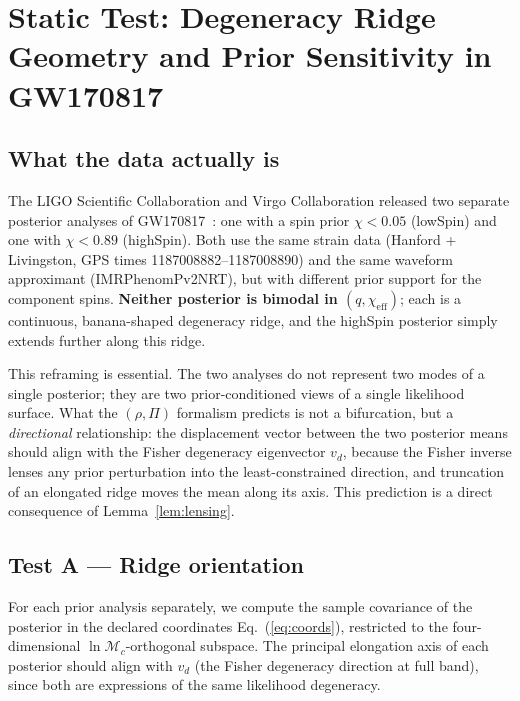 \documentclass[twocolumn,prd,showpacs,superscriptaddress]{revtex4-2}
\newcommand{\Mchirp}{\mathcal{M}_c}
\newcommand{\vd}{v_{d}}          %
\newcommand{\eqnref}[1]{Eq.~(\ref{eq:#1})}
\begin{document}
\section{Static Test: Degeneracy Ridge Geometry and Prior Sensitivity in GW170817}
\label{sec:static}

\subsection{What the data actually is}

The LIGO Scientific Collaboration and Virgo Collaboration released two separate posterior analyses of GW170817~\cite{abbott2017gw170817,abbott2019gw170817_params}: one with a spin prior $\chi < 0.05$ (lowSpin) and one with $\chi < 0.89$ (highSpin). Both use the same strain data (Hanford + Livingston, GPS times 1187008882--1187008890) and the same waveform approximant (IMRPhenomPv2NRT), but with different prior support for the component spins. \textbf{Neither posterior is bimodal in $(q, \chi_{\text{eff}})$}; each is a continuous, banana-shaped degeneracy ridge, and the highSpin posterior simply extends further along this ridge.

This reframing is essential. The two analyses do not represent two modes of a single posterior; they are two prior-conditioned views of a single likelihood surface. What the $(\rho, \Pi)$ formalism predicts is not a bifurcation, but a \emph{directional} relationship: the displacement vector between the two posterior means should align with the Fisher degeneracy eigenvector $\vd$, because the Fisher inverse lenses any prior perturbation into the least-constrained direction, and truncation of an elongated ridge moves the mean along its axis. This prediction is a direct consequence of Lemma~\ref{lem:lensing}.

\subsection{Test A --- Ridge orientation}

For each prior analysis separately, we compute the sample covariance of the posterior in the declared coordinates \eqnref{coords}, restricted to the four-dimensional $\ln\Mchirp$-orthogonal subspace. The principal elongation axis of each posterior should align with $\vd$ (the Fisher degeneracy direction at full band), since both are expressions of the same likelihood degeneracy.
\end{document}
